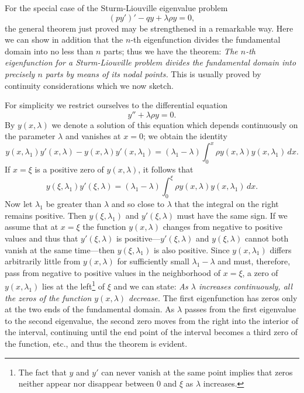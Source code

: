 For the special case of the Sturm-Liouville eigenvalue problem
\[
(py')'-qy+\lambda\rho y=0,
\]
the general theorem just proved may be strengthened in a remarkable way. Here we can show in addition that the $n$-th eigenfunction divides the fundamental domain into no less than $n$ parts; thus we have the theorem: \emph{The $n$-th eigenfunction for a Sturm-Liouville problem divides the fundamental domain into precisely $n$ parts by means of its nodal points.} This is usually proved by continuity considerations which we now sketch.

For simplicity we restrict ourselves to the differential equation
\[
y''+\lambda\rho y=0.
\]
By $y(x,\lambda)$ we denote a solution of this equation which depends continuously on the parameter $\lambda$ and vanishes at $x=0$; we obtain the identity
\[
y(x,\lambda_1)y'(x,\lambda)-y(x,\lambda)y'(x,\lambda_1)
=(\lambda_1-\lambda)\int_0^x\rho y(x,\lambda)y(x,\lambda_1)\,dx.
\]
If $x=\xi$ is a positive zero of $y(x,\lambda)$, it follows that
\[
y(\xi,\lambda_1)y'(\xi,\lambda)
=(\lambda_1-\lambda)\int_0^\xi\rho y(x,\lambda)y(x,\lambda_1)\,dx.
\]
Now let $\lambda_1$ be greater than $\lambda$ and so close to $\lambda$ that the integral on the right remains positive. Then $y(\xi,\lambda_1)$ and $y'(\xi,\lambda)$ must have the same sign. If we assume that at $x=\xi$ the function $y(x,\lambda)$ changes from negative to positive values and thus that $y'(\xi,\lambda)$ is positive---$y'(\xi,\lambda)$ and $y(\xi,\lambda)$ cannot both vanish at the same time---then $y(\xi,\lambda_1)$ is also positive. Since $y(x,\lambda_1)$ differs arbitrarily little from $y(x,\lambda)$ for sufficiently small $\lambda_1-\lambda$ and must, therefore, pass from negative to positive values in the neighborhood of $x=\xi$, a zero of $y(x,\lambda_1)$ lies at the left\footnote{The fact that $y$ and $y'$ can never vanish at the same point implies that zeros neither appear nor disappear between $0$ and $\xi$ as $\lambda$ increases.} of $\xi$ and we can state: \emph{As $\lambda$ increases continuously, all the zeros of the function $y(x,\lambda)$ decrease.} The first eigenfunction has zeros only at the two ends of the fundamental domain. As $\lambda$ passes from the first eigenvalue to the second eigenvalue, the second zero moves from the right into the interior of the interval, continuing until the end point of the interval becomes a third zero of the function, etc., and thus the theorem is evident.

